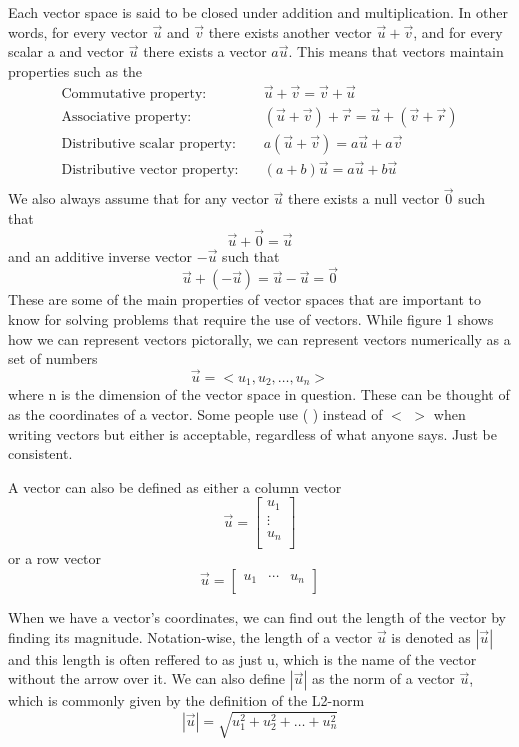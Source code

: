 \documentclass{article}
\newcommand{\be}{\begin{equation}}
\newcommand{\ee}{\end{equation}}
\begin{document}
Each vector space is said to be closed under addition and multiplication.
In other words, for every vector $\vec{u}$ and $\vec{v}$ there exists another vector $\vec{u} + \vec{v}$, and for every scalar a and vector $\vec{u}$ there exists a vector $a \vec{u}$.
This means that vectors maintain properties such as the
\be
  \begin{split}
    \text{Commutative property:} \quad & \vec{u} + \vec{v} = \vec{v} + \vec{u} \\
    \text{Associative property:} \quad & (\vec{u} + \vec{v}) + \vec{r} = \vec{u} + (\vec{v} + \vec{r}) \\
    \text{Distributive scalar property:} \quad & a(\vec{u} + \vec{v}) = a\vec{u} + a\vec{v} \\
    \text{Distributive vector property:} \quad & (a + b)\vec{u} = a\vec{u} + b\vec{u} \\
  \end{split}
\ee
We also always assume that for any vector $\vec{u}$ there exists a null vector $\vec{0}$ such that
\be
  \vec{u} + \vec{0} = \vec{u}
\ee
and an additive inverse vector $-\vec{u}$ such that
\be
  \vec{u} + (- \vec{u}) = \vec{u} - \vec{u} = \vec{0}
\ee
These are some of the main properties of vector spaces that are important to know for solving problems that require the use of vectors.
While figure 1 shows how we can represent vectors pictorally, we can represent vectors numerically as a set of numbers
\be
  \vec{u} = < u_1 , u_2 , \hdots , u_n >
\ee
where n is the dimension of the vector space in question.
These can be thought of as the coordinates of a vector.
Some people use ( \quad ) instead of $<$ $>$ when writing vectors but either is acceptable, regardless of what anyone says.
Just be consistent.

A vector can also be defined as either a column vector
\[
\vec{u} =
\begin{bmatrix}
  u_{1} \\
  \vdots \\
  u_{n} \\
\end{bmatrix}
\]
or a row vector
\[
\vec{u} =
\begin{bmatrix}
  u_{1} & \cdots & u_{n} \\
\end{bmatrix}
\]

When we have a vector's coordinates, we can find out the length of the vector by finding its magnitude.
Notation-wise, the length of a vector $\vec{u}$ is denoted as $| \vec{u} |$ and this length is often reffered to as just u, which is the name of the vector without the arrow over it.
We can also define $| \vec{u} |$ as the norm of a vector $\vec{u}$, which is commonly given by the definition of the L2-norm
\be
  | \vec{u} | = \sqrt{u^2_1 + u^2_2 + \hdots + u^2_n}
\ee
\end{document}

